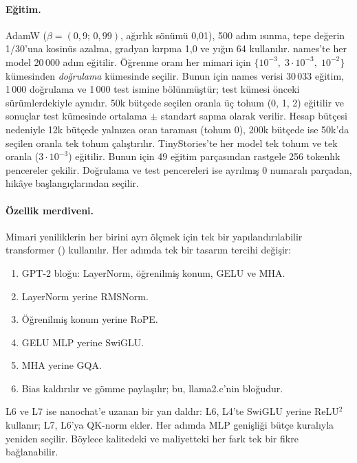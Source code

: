 \paragraph{Eğitim.} AdamW ($\beta=(0{,}9;\,0{,}99)$, ağırlık sönümü 0,01), 500 adım ısınma, tepe değerin 1/30'una kosinüs
azalma, gradyan kırpma 1,0 ve yığın 64 kullanılır. names'te her model 20\,000 adım eğitilir. Öğrenme oranı her mimari
için $\{10^{-3},\;3\cdot10^{-3},\;10^{-2}\}$ kümesinden \emph{doğrulama} kümesinde seçilir. Bunun için names verisi
30\,033 eğitim, 1\,000 doğrulama ve 1\,000 test ismine bölünmüştür; test kümesi önceki sürümlerdekiyle aynıdır. 50k
bütçede seçilen oranla üç tohum (0, 1, 2) eğitilir ve sonuçlar test kümesinde ortalama $\pm$ standart sapma olarak
verilir. Hesap bütçesi nedeniyle 12k bütçede yalnızca oran taraması (tohum 0), 200k bütçede ise 50k'da seçilen oranla
tek tohum çalıştırılır. TinyStories'te her model tek tohum ve tek oranla ($3\cdot10^{-3}$) eğitilir. Bunun için 49
eğitim parçasından rastgele 256 tokenlık pencereler çekilir. Doğrulama ve test pencereleri ise ayrılmış 0 numaralı
parçadan, hikâye başlangıçlarından seçilir.

\paragraph{Özellik merdiveni.} Mimari yeniliklerin her birini ayrı ölçmek için tek bir yapılandırılabilir transformer
() kullanılır. Her adımda tek bir tasarım tercihi değişir:
\begin{enumerate}[label=L\arabic*:, start=0]
  \item GPT-2 bloğu: LayerNorm, öğrenilmiş konum, GELU ve MHA.
  \item LayerNorm yerine RMSNorm.
  \item Öğrenilmiş konum yerine RoPE.
  \item GELU MLP yerine SwiGLU.
  \item MHA yerine GQA.
  \item Bias kaldırılır ve gömme paylaşılır; bu, llama2.c'nin bloğudur.
\end{enumerate}
L6 ve L7 ise nanochat'e uzanan bir yan daldır: L6, L4'te SwiGLU yerine ReLU$^2$ kullanır; L7, L6'ya QK-norm ekler. Her
adımda MLP genişliği bütçe kuralıyla yeniden seçilir. Böylece kalitedeki ve maliyetteki her fark tek bir fikre
bağlanabilir.

